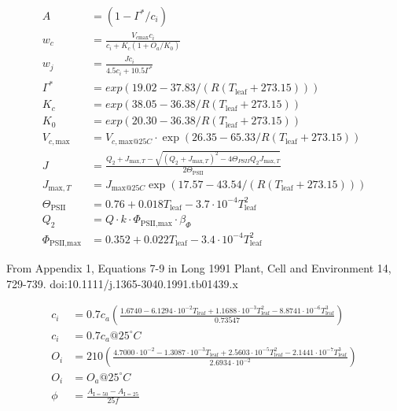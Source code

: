 \documentclass[24pt]{report}
\begin{document}
\begin{align}
A &= \left(1-\Gamma^\ast/c_i\right) \\
w_c &= \frac{V_{c\text{max}}c_i}{c_i+K_c(1+O_a/K_0)}\\
w_j &= \frac{Jc_i}{4.5c_i + 10.5\Gamma^{*}}\\
\Gamma^\ast &= exp(19.02 - 37.83/(R(T_\text{leaf}+273.15)))\\
K_c &= exp(38.05-36.38/R(T_\text{leaf}+273.15))\\
K_0&=exp(20.30-36.38/R(T_\text{leaf}+273.15))\\
V_{c,\text{max}}&=V_{c,\text{max}@25C}\cdot \exp(26.35-65.33/R(T_\text{leaf}+273.15))\\
J&=\frac{Q_2+J_{\text{max},T}-\sqrt{(Q_2+J_{\text{max},T})^2-4\Theta_{PSII}Q_2J_{\text{max},T}}}{2\Theta_{\text{PSII}}}\\
J_{\text{max},T}&=J_{\text{max}@25C}\exp(17.57-43.54/(R(T_\text{leaf}+273.15))) \\
\Theta_\text{PSII} &= 0.76+0.018T_\text{leaf}-3.7\cdot10^{-4}T_\text{leaf}^2\\
Q_2&=Q\cdot k\cdot \Phi_\text{PSII,max}\cdot\beta_\Phi\\
\Phi_\text{PSII,max}&= 0.352 + 0.022T_\text{leaf} - 3.4\cdot10^{-4} T_\text{leaf}^2
\end{align}

From Appendix 1, Equations 7-9 in Long 1991 Plant, Cell and Environment 14, 729-739. doi:10.1111/j.1365-3040.1991.tb01439.x

\begin{align}
c_i &= 0.7c_a\left(\frac{1.6740-6.1294\cdot10^{-2}T_\text{leaf}+1.1688\cdot10^{-3}T_\text{leaf}^2-8.8741\cdot10^{-6}T_\text{leaf}^3}{0.73547}\right)\\
c_i&=0.7c_a @ 25^{\circ}C \\
O_i&=210\left(\frac{4.7000\cdot10^{-2}-1.3087\cdot10^{-3}T_\text{leaf}+2.5603\cdot10^{-5}T_\text{leaf}^2-2.1441\cdot10^{-7}T_\text{leaf}^3}{2.6934\cdot10^{-2}}\right)\\
O_i&=O_a  @ 25^{\circ}C\\
\phi&=\frac{A_{\text{I}=50}-A_{\text{I}=25}}{25f}
\end{align}
\end{document}
